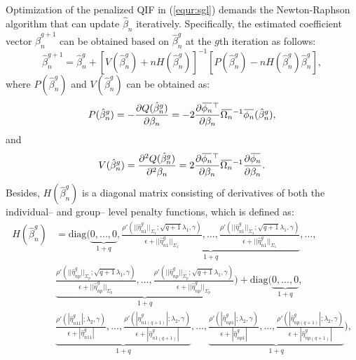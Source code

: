 \documentclass[12pt]{article}
\newcommand{\overbar}[1]{\mkern 1.5mu\overline{\mkern-1.5mu#1\mkern-1.5mu}\mkern 1.5mu}
\begin{document}
Optimization of the penalized QIF in (\ref{equr:sgl}) demands the Newton-Raphson algorithm that can update $\hat{\beta}_n$ iteratively. Specifically, the estimated coefficient vector $\hat{\beta}_n^{g+1}$ can be obtained based on $\hat{\beta}_n^{g}$ at the $g$th iteration as follows:
\begin{equation}\label{equr:2}
	\hat{\beta}_n^{g+1}=\hat{\beta}_n^{g}+[V(\hat{\beta}_n^{g})+nH(\hat{\beta}_n^{g})]^{-1}[P(\hat{\beta}_n^{g})-nH(\hat{\beta}_n^{g})\hat{\beta}_n^{g}],
\end{equation}
where $P(\hat{\beta}_n^{g})$ and $V(\hat{\beta}_n^{g})$ can be obtained as:
\begin{equation*}
	P(\hat{\beta}_n^{g})=-\frac{\partial Q(\hat{\beta}_n^{g})}{\partial \beta_n}=-2\frac{\partial \overbar{\phi_n}^\top}{\partial \beta_n} \overbar{\Omega_n}^{-1}\overbar{\phi_n}(\hat{\beta}_n^{g}),
\end{equation*}
and 
\begin{equation*}
	V(\hat{\beta}_n^{g})=\frac{\partial^2 Q(\hat{\beta}_n^{g})}{\partial^2 \beta_n}=2\frac{\partial \overbar{\phi_n}^\top}{\partial \beta_n} \overbar{\Omega_n}^{-1}\frac{\partial \overbar{\phi_n}}{\partial \beta_n}.
\end{equation*}
Besides, $H(\hat{\beta}_n^{g})$ is a diagonal matrix consisting of derivatives of both the individual-- and group-- level penalty functions, which is defined as: 
\begin{equation*}
	\begin{aligned}
		H(\hat{\beta}_n^{g})&=\text{diag}(\underbrace{0,...,0}_{1+q},\underbrace{\frac{\rho'(||\hat{\eta}_{n1}^{g}||_{\Sigma_{1}};\sqrt{q+1}\lambda_{1},\gamma)}{\epsilon+||\hat{\eta}_{n1}^{g}||_{\Sigma_{1}}},...,\frac{\rho'(||\hat{\eta}_{n1}^{g}||_{\Sigma_{1}};\sqrt{q+1}\lambda_{1},\gamma)}{\epsilon+||\hat{\eta}_{n1}^{g}||_{\Sigma_{1}}}}_{1+q},...,\\ &\underbrace{\frac{\rho'(||\hat{\eta}_{np}^{g}||_{\Sigma_{p}};\sqrt{q+1}\lambda_{1},\gamma)}{\epsilon+||\hat{\eta}_{np}^{g}||_{\Sigma_{p}}},...,\frac{\rho'(||\hat{\eta}_{np}^{g}||_{\Sigma_{p}};\sqrt{q+1}\lambda_{1},\gamma)}{\epsilon+||\hat{\eta}_{np}^{g}||_{\Sigma_{p}}}}_{1+q})+\text{diag}(\underbrace{0,...,0}_{1+q},\\ &\underbrace{\frac{\rho'(|\hat{\eta}_{n11}^{g}|;\lambda_{2},\gamma)}{\epsilon+|\hat{\eta}_{n11}^{g}|},...,\frac{\rho'(|\hat{\eta}_{n1(q+1)}^{g}|;\lambda_{2},\gamma)}{\epsilon+|\hat{\eta}_{n1(q+1)}^{g}|}}_{1+q},...,\underbrace{\frac{\rho'(|\hat{\eta}_{np1}^{g}|;\lambda_{2},\gamma)}{\epsilon+|\hat{\eta}_{np1}^{g}|},...,\frac{\rho'(|\hat{\eta}_{np(q+1)}^{g}|;\lambda_{2},\gamma)}{\epsilon+|\hat{\eta}_{np(q+1)}^{g}|}}_{1+q}),
	\end{aligned}
\end{equation*}
\end{document}
